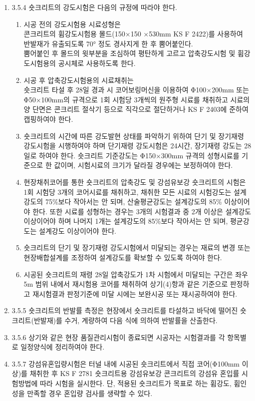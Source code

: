 \documentclass[12pt,a4paper]{article}
\begin{document}
\begin{enumerate}
\item 3.5.4 숏크리트의 강도시험은 다음의 규정에 따라야 한다.  
\begin{enumerate}
	\item 시공 전의 강도시험용 시료성형은 \\ 콘크리트의 휨강도시험용 몰드(150×150 ×530mm KS F 2422)를 사용하여 반발재가 유출되도록 70° 정도 경사지게 한 후 뿜어붙인다. \\뿜어붙인 후 몰드의 윗부분을 조심하여 평탄하게 고르고 압축강도시험 및 휨강도시험용의 공시체로 사용하도록 한다. 
\item 시공 후 압축강도시험용의 시료채취는 \\ 숏크리트 타설 후 28일 경과 시 코어보링머신을 이용하여 Φ100×200mm 또는 Φ50×100mm의 규격으로 1회 시험당 3개씩의 원주형 시료를 채취하고 시료의 양 단면은 콘크리트 절삭기 등으로 직각으로 절단하거나 KS F 2403에 준하여 캡핑하여야 한다. 
\item 숏크리트의 시간에 따른 강도발현 상태를 파악하기 위하여 단기 및 장기재령 강도시험을 시행하여야 하며 단기재령 강도시험은 24시간, 장기재령 강도는 28일로 하여야 한다. 숏크리트 기준강도는 Φ150×300mm 규격의 성형시료를 기준으로 한 값이며, 시험시료의 크기가 달라질 경우에는 보정하여야 한다.  
\item 현장채취코어를 통한 숏크리트의 압축강도 및 강섬유보강 숏크리트의 시험은 1회 시험당 3개의 코어시료를 채취하고, 채취한 모든 시료의 시험강도는 설계강도의 75\%보다 작아서는 안 되며, 산술평균강도는 설계강도의 85\% 이상이어야 한다. 또한 시료를 성형하는 경우는 3개의 시험결과 중 2개 이상은 설계강도 이상이어야 하며 나머지 1개는 설계강도의 85\%보다 작아서는 안 되며, 평균강도는 설계강도 이상이어야 한다. 
\item 숏크리트의 단기 및 장기재령 강도시험에서 미달되는 경우는 재료의 변경 또는 현장배합설계를 조정하여 설계강도를 확보할 수 있도록 하여야 한다. 
\item 시공된 숏크리트의 재령 28일 압축강도가 1차 시험에서 미달되는 구간은 좌우 5m 범위 내에서 재시험용 코어를 채취하여 상기(4)항과 같은 기준으로 판정하고 재시험결과 판정기준에 미달 시에는 보완시공 또는 재시공하여야 한다. 
\end{enumerate}
\item  3.5.5 숏크리트의 반발률 측정은 현장에서 숏크리트를 타설하고 바닥에 떨어진 숏크리트(반발재)를 수거, 계량하여 다음 식에 의하여 반발률을 산출한다.  
\item  3.5.6 상기와 같은 현장 품질관리시험이 종료되면 시공자는 시험결과를 각 항목별로 일정양식에 정리하여야 한다.  
\item  3.5.7 강섬유혼입량시험은 터널 내에 시공된 숏크리트에서 직접 코어(Φ100mm 이상)를 채취한 후 KS F 2781 숏크리트용 강섬유보강 콘크리트의 강섬유 혼입률 시험방법에 따라 시험을 실시한다. 단, 적용된 숏크리트가 목표로 하는 휨강도, 휨인성을 만족할 경우 혼입량 검사를 생략할 수 있다.   
\end{enumerate}
\end{document}
